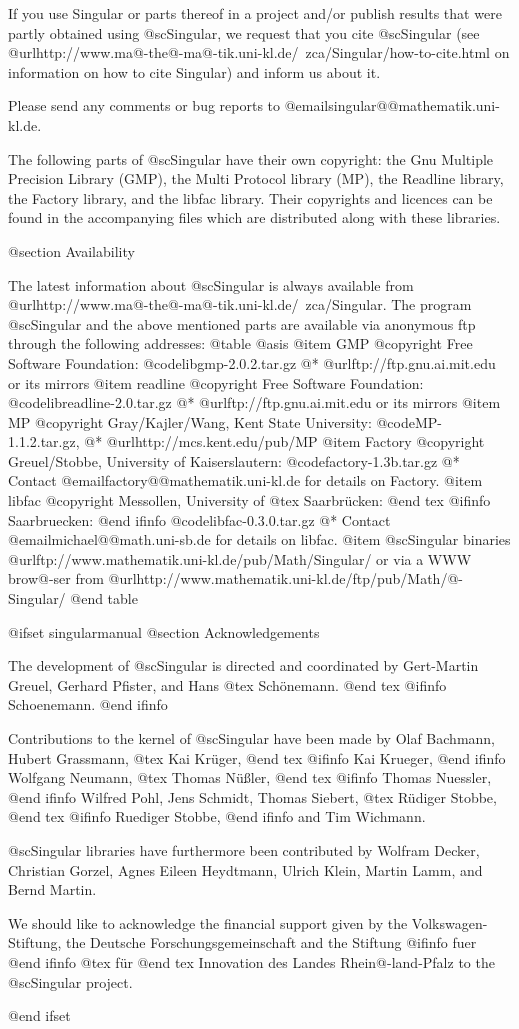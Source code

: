 If you use Singular or parts thereof in a project and/or publish
results that were partly obtained using @sc{Singular}, we request that you
cite @sc{Singular} (see
@url{http://www.ma@-the@-ma@-tik.uni-kl.de/~zca/Singular/how-to-cite.html} 
on information on how to cite Singular) and inform us about it.

Please send any comments or bug reports to
@email{singular@@mathematik.uni-kl.de}.

The following parts of @sc{Singular} have their own copyright: the Gnu Multiple
Precision Library (GMP), the Multi Protocol library (MP), the Readline library,
the Factory library, and the libfac library.
Their copyrights and licences can be found in the accompanying files
which are distributed along with these libraries.

@section Availability

The latest information about @sc{Singular} is always available from
@url{http://www.ma@-the@-ma@-tik.uni-kl.de/~zca/Singular}.
The program @sc{Singular} and the above mentioned parts are available via
anonymous ftp through the following addresses:
@table @asis
@item GMP
@copyright{} Free Software Foundation:
@code{libgmp-2.0.2.tar.gz}
@* @url{ftp://ftp.gnu.ai.mit.edu} or its mirrors
@item readline
@copyright{} Free Software Foundation:
@code{libreadline-2.0.tar.gz}
@* @url{ftp://ftp.gnu.ai.mit.edu} or its mirrors
@item MP
@copyright{} Gray/Kajler/Wang, Kent State University:
@code{MP-1.1.2.tar.gz},
@* @url{http://mcs.kent.edu/pub/MP}
@item Factory
@copyright{} Greuel/Stobbe, University of Kaiserslautern:
@code{factory-1.3b.tar.gz}
@* Contact @email{factory@@mathematik.uni-kl.de} for details on Factory.
@item libfac
@copyright{}  Messollen, University of 
@tex
Saarbr\"ucken:
@end tex
@ifinfo
Saarbruecken:
@end ifinfo
@code{libfac-0.3.0.tar.gz}
@* Contact @email{michael@@math.uni-sb.de} for details on libfac.
@item @sc{Singular} binaries
@url{ftp://www.mathematik.uni-kl.de/pub/Math/Singular/} or via a
WWW brow@-ser from
@url{http://www.mathematik.uni-kl.de/ftp/pub/Math/@-Singular/}
@end table

@ifset singularmanual
@section Acknowledgements

The development of @sc{Singular} is directed and coordinated by
Gert-Martin Greuel, Gerhard Pfister, and Hans
@tex
Sch\"onemann.
@end tex
@ifinfo
Schoenemann.
@end ifinfo

Contributions to the kernel of @sc{Singular} have been made by
Olaf Bachmann,
Hubert Grassmann,
@tex
Kai Kr\"uger,
@end tex
@ifinfo
Kai Krueger,
@end ifinfo
Wolfgang Neumann,
@tex
Thomas N\"u{\ss}ler,
@end tex
@ifinfo
Thomas Nuessler,
@end ifinfo
Wilfred Pohl,
Jens Schmidt,
Thomas Siebert,
@tex
R\"udiger Stobbe,
@end tex
@ifinfo
Ruediger Stobbe,
@end ifinfo
and
Tim Wichmann.

@sc{Singular} libraries have furthermore been contributed by 
Wolfram Decker,
Christian Gorzel,
Agnes Eileen Heydtmann,
Ulrich Klein,
Martin Lamm,
and
Bernd Martin.

We should like to acknowledge the financial support given by
the Volkswagen-Stiftung,
the Deutsche Forschungsgemeinschaft
and the Stiftung
@ifinfo
fuer
@end ifinfo
@tex
f\"ur
@end tex
Innovation des Landes Rhein@-land-Pfalz
to the
@sc{Singular} project.

@end ifset
